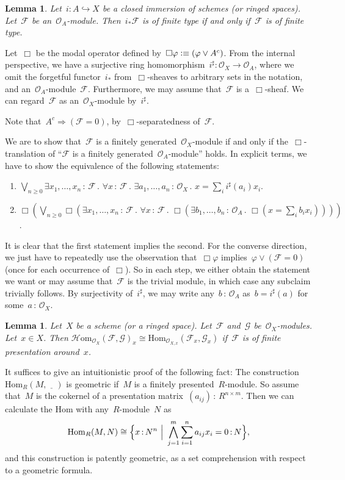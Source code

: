 \documentclass[10pt,reqno,a4paper]{amsbook}
\makeatletter
\theoremstyle{definition}
\theoremstyle{plain}
\newtheorem{lemma}[defn]{Lemma}
\theoremstyle{remark}
\newcommand{\F}{\mathcal{F}}
\renewcommand{\G}{\mathcal{G}}
\renewcommand{\O}{\mathcal{O}}
\newcommand{\Hom}{\mathrm{Hom}}
\newcommand{\HOM}{\mathcal{H}\mathrm{om}}
\newcommand{\placeholder}{\underline{\quad}}
\newcommand{\?}{\,{:}\,}
\renewcommand{\_}{\mathpunct{.}\,}
\newcommand{\defequiv}{\vcentcolon\equiv}
\renewenvironment{proof}[1][\proofname]{\par
  \pushQED{\qed}%
  \normalfont \topsep6\p@\@plus6\p@\relax
  \trivlist
  \item[\hskip\labelsep
        \itshape
    #1\@addpunct{.}]\ignorespaces
}{%
  \popQED\endtrivlist\@endpefalse
}
\makeatother
\begin{document}
\begin{lemma}\label{lemma:pushforward-finite-type}
Let~$i : A \hookrightarrow X$ be a closed immersion of schemes (or
ringed spaces). Let~$\F$ be an~$\O_A$-module. Then~$i_*\F$ is of finite type if
and only if~$\F$ is of finite type.\end{lemma}
\begin{proof}
Let~$\Box$ be the modal operator defined by~$\Box\varphi \defequiv (\varphi \vee
A^c)$. From the internal perspective, we have a surjective ring homomorphism~$i^\sharp
: \O_X \to \O_A$, where we omit the forgetful functor~$i_*$ from~$\Box$-sheaves
to arbitrary sets in the notation, and an~$\O_A$-module~$\F$. Furthermore, we
may assume that~$\F$ is a~$\Box$-sheaf. We can regard~$\F$ as an~$\O_X$-module
by~$i^\sharp$.

Note that~$A^c \Rightarrow (\F = 0)$, by~$\Box$-separatedness of~$\F$.

We are to show that~$\F$ is a finitely generated~$\O_X$-module if and only if
the~$\Box$-translation of ``$\F$ is a finitely generated~$\O_A$-module'' holds.
In explicit terms, we have to show the equivalence of the following statements:
\begin{enumerate}
\item $\bigvee_{n \geq 0} \exists x_1,\ldots,x_n\?\F\_
  \forall x\?\F\_ \exists a_1,\ldots,a_n\?\O_X\_ x = \sum_i i^\sharp(a_i) x_i$.
\item $\Box(\bigvee_{n \geq 0} \Box(\exists x_1,\ldots,x_n\?\F\_
  \forall x\?\F\_ \Box(\exists b_1,\ldots,b_n\?\O_A\_ \Box(
    x = \sum_i b_i x_i))))$.
\end{enumerate}
It is clear that the first statement implies the second. For the converse
direction, we just have to repeatedly use the observation that~$\Box\varphi$
implies~$\varphi \vee (\F = 0)$ (once for each occurrence of~$\Box$). So in each
step, we either obtain the statement we want or may assume
that~$\F$ is the trivial module, in which case any subclaim trivially follows. By
surjectivity of~$i^\sharp$, we may write any~$b\?\O_A$ as~$b =
i^\sharp(a)$ for some~$a\?\O_X$.
\end{proof}

\begin{lemma}\label{lemma:fp-hom-geometric}
Let~$X$ be a scheme (or a ringed space). Let~$\F$ and~$\G$ be~$\O_X$-modules. Let~$x
\in X$. Then $\HOM_{\O_X}(\F,\G)_x \cong \Hom_{\O_{X,x}}(\F_x,\G_x)$ if~$\F$ is
of finite presentation around~$x$.\end{lemma}
\begin{proof}It suffices to give an intuitionistic proof of the following fact:
The construction~$\Hom_R(M,\placeholder)$ is geometric if~$M$ is a finitely
presented~$R$-module. So assume that~$M$ is the cokernel of a presentation
matrix~$(a_{ij}) \? R^{n \times m}$. Then we can calculate the Hom with
any~$R$-module~$N$ as
\[ \Hom_R(M,N) \cong \Bigl\{ x \? N^n \ \Big|\ \bigwedge_{j=1}^m \sum_{i=1}^n a_{ij}
x_i = 0 \? N \Bigr\}, \]
and this construction is patently geometric, as a set comprehension with respect to
a geometric formula.
\end{proof}
\end{document}
